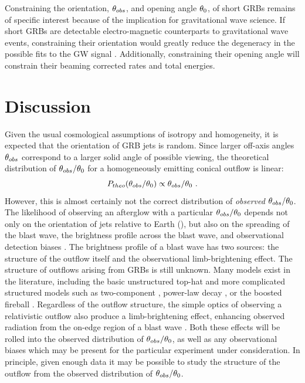 Constraining the orientation, $\theta_{obs}$, and opening angle $\theta_0$, of short GRBs remains of specific interest because of the implication for gravitational wave science. If short GRBs are detectable electro-magnetic counterparts to gravitational wave events, constraining their orientation would greatly reduce the degeneracy in the possible fits to the GW signal \citep{Nissanke13, Arun14}.  Additionally, constraining their opening angle will constrain their beaming corrected rates and total energies.



\section{Discussion}

Given the usual cosmological assumptions of isotropy and homogeneity, it is expected that the orientation of GRB jets is random.  Since larger off-axis angles $\theta_{obs}$ correspond to a larger solid angle of possible viewing, the theoretical distribution of $\theta_{obs}/\theta_0$ for a homogeneously emitting conical outflow is linear:
\begin{equation}
	P_{theo}(\thobs/\thO) \propto \thobs / \thO \ . \eqlabel{theo}
\end{equation}
However, this is almost certainly not the correct distribution of \emph{observed} $\theta_{obs}/\theta_0$.  The likelihood of observing an afterglow with a particular $\theta_{obs}/\theta_0$ depends not only on the orientation of jets relative to Earth (), but also on the spreading of the blast wave, the brightness profile across the blast wave, and observational detection biases \citep[see e.g.][]{vanEer12obs}.  The brightness profile of a blast wave has two sources: the structure of the outflow itself and the observational limb-brightening effect.  The structure of outflows arising from GRBs is still unknown.  Many models exist in the literature, including the basic unstructured top-hat and more complicated structured models such as two-component \citep[e.g.][]{Berger03}, power-law decay \citep{Rossi02}, or the boosted fireball \citep{Duffell13B}.  Regardless of the outflow structure, the simple optics of observing a relativistic outflow also produce a limb-brightening effect, enhancing observed radiation from the on-edge region of a blast wave \citep{Meszaros06}.  Both these effects will be rolled into the observed distribution of $\theta_{obs}/\theta_0$, as well as any observational biases which may be present for the particular experiment under consideration.  In principle, given enough data it may be possible to study the structure of the outflow from the observed distribution of $\theta_{obs}/\theta_0$.


